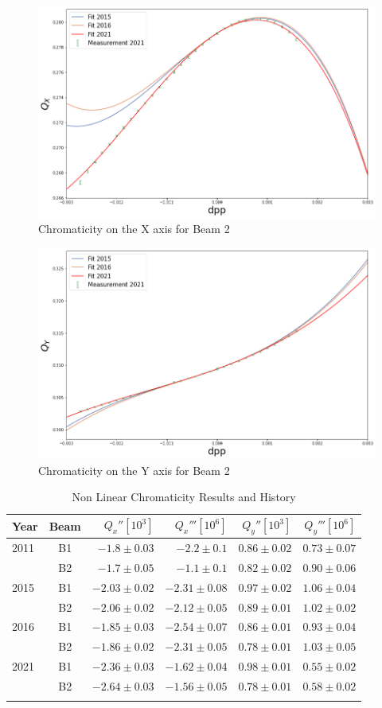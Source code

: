 \documentclass[a4paper]{cernatsnote}
\begin{document}
\begin{figure}[H]
  \centering
  \includegraphics[width=.8\linewidth]{plots/beam2/qxb2.png}  
  \caption{Chromaticity on the X axis for Beam 2}
\end{figure}
\begin{figure}[H]
  \centering
  \includegraphics[width=.8\linewidth]{plots/beam2/qyb2.png}  
  \caption{Chromaticity on the Y axis for Beam 2}
\end{figure}

\begin{longtable}[h]{@{}l|c|rr|rr@{}}
  \toprule
  Year & Beam & $Q_x''[10^3]$ &   $Q_x'''[10^6]$ &   $Q_y''[10^3]$ &  $Q_y'''[10^6]$ \\
  \midrule
  \endhead
  2011 &   B1 &   $-1.8 \pm 0.03$ &  $-2.2 \pm 0.1$ &   $0.86 \pm 0.02$ &   $0.73 \pm 0.07$ \\
       &   B2 &   $-1.7 \pm 0.05$ &  $-1.1 \pm 0.1$ &   $0.82 \pm 0.02$ &   $0.90 \pm 0.06$ \\
  \midrule
  2015 &   B1 &   $-2.03 \pm 0.02$ &  $-2.31 \pm 0.08$ &   $0.97 \pm 0.02$ &   $1.06 \pm 0.04$ \\
       &   B2 &   $-2.06 \pm 0.02$ &  $-2.12 \pm 0.05$ &   $0.89 \pm 0.01$ &   $1.02 \pm 0.02$ \\
  \midrule
  2016 &   B1 &   $-1.85 \pm 0.03$ &  $-2.54 \pm 0.07$ &   $0.86 \pm 0.01$ &   $0.93 \pm 0.04$ \\
       &   B2 &   $-1.86 \pm 0.02$ &  $-2.31 \pm 0.05$ &   $0.78 \pm 0.01$ &   $1.03 \pm 0.05$ \\
  \midrule
  2021 &   B1 &   $-2.36 \pm 0.03$ &  $-1.62 \pm 0.04$ &  $0.98 \pm 0.01$ &  $0.55 \pm 0.02$ \\
       &   B2 &   $-2.64 \pm 0.03$ &  $-1.56 \pm 0.05$ &  $0.78 \pm 0.01$ &   $0.58 \pm 0.02$ \\
  \bottomrule
  \caption{Non Linear Chromaticity Results and History}
\end{longtable}
\end{document}
